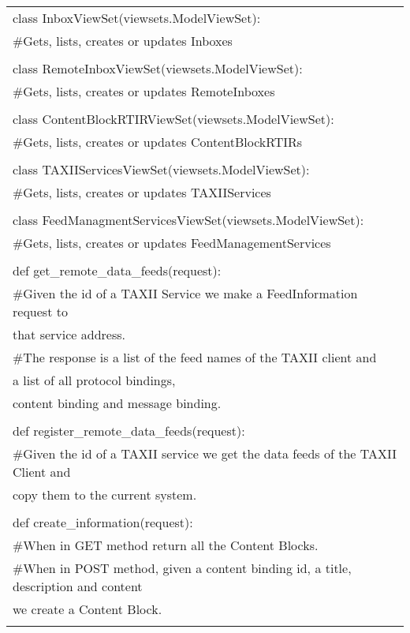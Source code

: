 \documentclass[11pt]{article}
\begin{document}
\begin{center}
	\begin{longtable}{|l|}
		\hline
		
		class InboxViewSet(viewsets.ModelViewSet):\\
		\#Gets, lists, creates or updates Inboxes\\ \\
		
		class RemoteInboxViewSet(viewsets.ModelViewSet):\\
		\#Gets, lists, creates or updates RemoteInboxes\\ \\
		
		class ContentBlockRTIRViewSet(viewsets.ModelViewSet):\\
		\#Gets, lists, creates or updates ContentBlockRTIRs\\ \\
		
		class TAXIIServicesViewSet(viewsets.ModelViewSet):\\
		\#Gets, lists, creates or updates TAXIIServices\\ \\
		
		class FeedManagmentServicesViewSet(viewsets.ModelViewSet):\\
		\#Gets, lists, creates or updates FeedManagementServices\\ \\
		
		
		def get\_remote\_data\_feeds(request):\\
		\#Given the id of a TAXII Service we make a FeedInformation request to\\ that service address.\\
		\#The response is a list of the feed names of the TAXII client and\\ a list of all protocol bindings,\\ content binding and message binding.\\ \\
		
		def register\_remote\_data\_feeds(request):\\
		\#Given the id of a TAXII service we get the data feeds of the TAXII Client and\\ copy them to the current system.\\ \\
		
		def create\_information(request):\\
		\#When in GET method return all the Content Blocks.\\
		\#When in POST method, given a content binding id, a title, description and content\\ we create a Content Block.\\ \\
		

\end{longtable}
\end{center}
\end{document}

